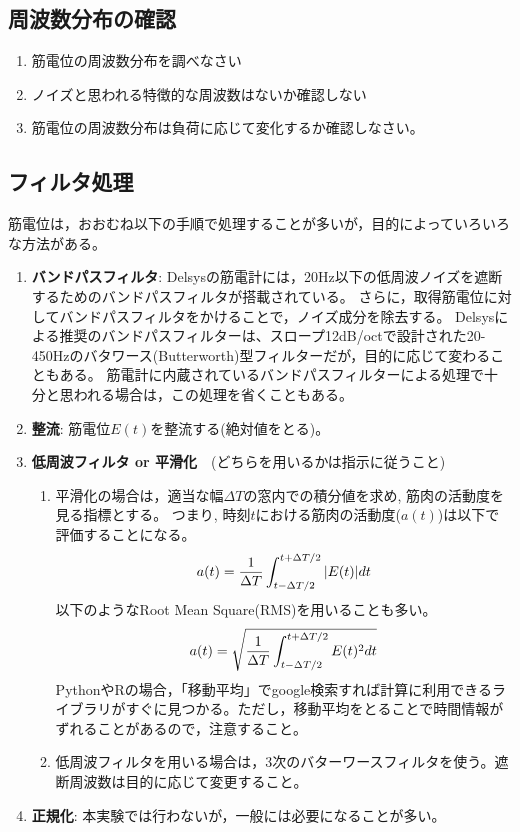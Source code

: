 \documentclass{jsarticle}
\begin{document}
\subsection{周波数分布の確認}

\begin{enumerate}
\item 筋電位の周波数分布を調べなさい
\item ノイズと思われる特徴的な周波数はないか確認しない
\item 筋電位の周波数分布は負荷に応じて変化するか確認しなさい。
\end{enumerate}

\subsection{フィルタ処理}
筋電位は，おおむね以下の手順で処理することが多いが，目的によっていろいろな方法がある。

\begin{enumerate}
\item \textbf{バンドパスフィルタ}: 
Delsysの筋電計には，20Hz以下の低周波ノイズを遮断するためのバンドパスフィルタが搭載されている。
さらに，取得筋電位に対してバンドパスフィルタをかけることで，ノイズ成分を除去する。
Delsysによる推奨のバンドパスフィルターは、スロープ12dB/octで設計された20-450Hzのバタワース(Butterworth)型フィルターだが，目的に応じて変わることもある。
筋電計に内蔵されているバンドパスフィルターによる処理で十分と思われる場合は，この処理を省くこともある。
\item \textbf{整流}: 筋電位$E(t)$を整流する(絶対値をとる)。
\item \textbf{低周波フィルタ or 平滑化}　(どちらを用いるかは指示に従うこと)
  \begin{enumerate}
    \item 平滑化の場合は，適当な幅$\Delta T$の窓内での積分値を求め, 筋肉の活動度を見る指標とする。
    つまり, 時刻$t$における筋肉の活動度($a(t)$)は以下で評価することになる。
    \begin{align}
      a(t)=\frac{1}{\Delta T}\int_{t-\Delta T/2}^{t+\Delta T/2}|E(t)|dt\notag
    \end{align}
    以下のようなRoot Mean Square(RMS)を用いることも多い。
    \begin{align}
      a(t)=\sqrt{\frac{1}{\Delta T}\int_{t-\Delta T/2}^{t+\Delta T/2}E(t)^2dt}\notag
    \end{align}
    PythonやRの場合，「移動平均」でgoogle検索すれば計算に利用できるライブラリがすぐに見つかる。ただし，移動平均をとることで時間情報がずれることがあるので，注意すること。
    \item 低周波フィルタを用いる場合は，3次のバターワースフィルタを使う。遮断周波数は目的に応じて変更すること。
  \end{enumerate}
\item \textbf{正規化}: 本実験では行わないが，一般には必要になることが多い。
\end{enumerate}
\end{document}
